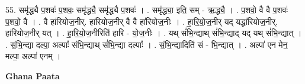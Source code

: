 \documentclass[17pt]{extarticle}
\begin{document}
55. समृ॑द्ध्यै प॒शवः॑ प॒शवः॒ समृ॑द्ध्यै॒ समृ॑द्ध्यै प॒शवः॑ । . समृ॑द्ध्या॒ इति॒ सम् - ऋ॒द्ध्यै॒ । . प॒शवो॒ वै वै प॒शवः॑ प॒शवो॒ वै । . वै हा॑रियोज॒नीर्. हा॑रियोज॒नीर् वै वै हा॑रियोज॒नीः । . हा॒रि॒यो॒ज॒नीर् यद् यद्धा॑रियोज॒नीर्. हा॑रियोज॒नीर् यत् । . हा॒रि॒यो॒ज॒नीरिति॑ हारि - यो॒ज॒नीः । . यथ् सं॑भि॒न्द्याथ् सं॑भि॒न्द्याद् यद् यथ् सं॑भि॒न्द्यात् । . सं॒भि॒न्द्या दल्पा॒ अल्पाः᳚ संभि॒न्द्याथ् सं॑भि॒न्द्या दल्पाः᳚ । . सं॒भि॒न्द्यादिति॑ सं - भि॒न्द्यात् । . अल्पा॑ एन मेन॒ मल्पा॒ अल्पा॑ एनम् । \newline

\textbf{Ghana Paata } \newline
\end{document}
